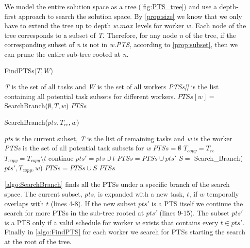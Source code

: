 We model the entire solution space as a tree (\cref{fig:PTS_tree}) and use a depth-first approach to search the solution space. By \cref{prop:size} we know that we only have to extend the tree up to depth $w.max$ levels for worker $w$. Each node of the tree corresponds to a subset of \emph{T}. Therefore, for any node \emph{n} of the tree, if the corresponding subset of \emph{n} is not in \emph{w.PTS}, according to \cref{prop:subset}, then we can prune the entire sub-tree rooted at \emph{n}.

\begin{algorithm}[h]
\caption{FindPTSs($T, W$)}
\label{algo:FindPTS}
\begin{algorithmic}[1]
\REQUIRE \emph{T} is the set of all tasks and \emph{W} is the set of all workers
\ENSURE \emph{PTSs[]} is the list containing all potential task subsets for different workers.
	\STATE $PTSs[w] = $ SearchBranch($\emptyset, T, w$)
\ENDFOR
\RETURN $PTSs$
\end{algorithmic}
\end{algorithm}

\begin{algorithm}[t]
\caption{SearchBranch($pts, T_{re}, w$)}
\label{algo:SearchBranch}
\begin{algorithmic}[1]
\REQUIRE \emph{pts} is the current subset, \emph{T} is the list of remaining tasks and \emph{w} is the worker
\ENSURE \emph{PTSs} is the set of all potential task subsets for \emph{w}
\STATE $PTSs = \emptyset$
\STATE $T_{copy} = T_{re}$
	\STATE $T_{copy} = T_{copy} \setminus t$
		\STATE continue
	\ENDIF
	\STATE $pts' = pts \cup t$
		\STATE $PTSs = PTSs \cup pts'$
			\STATE $S =$ Search\_Branch($pts', T_{copy}, w$)
			\STATE $PTSs = PTSs \cup S$
		\ENDIF
	\ENDIF
\ENDFOR
\RETURN $PTSs$
\end{algorithmic}
\end{algorithm}

\cref{algo:SearchBranch} finds all the PTSs under a specific branch of the search space. The current subset, $pts$, is expanded with a new task, $t$, if $w$ temporally overlaps with $t$ (lines 4-8). If the new subset $pts'$ is a PTS itself we continue the search for more PTSs in the sub-tree rooted at $pts'$ (lines  9-15). The subset $pts'$ is a PTS only if a valid schedule for worker $w$ exists that contains every $t \in pts'$. Finally in \cref{algo:FindPTS} for each worker we search for PTSs starting the search at the root of the tree.

